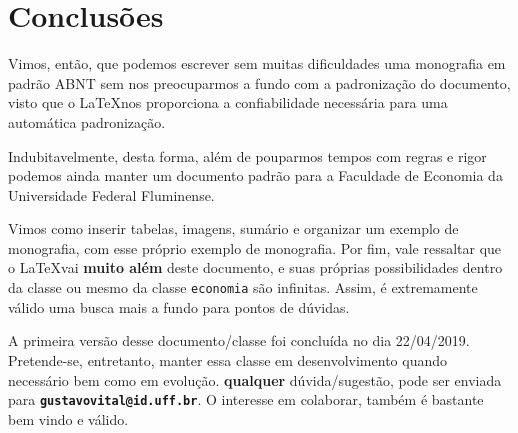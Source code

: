 \chapter{Conclusões}
\label{cap:conclusoes}

Vimos, então, que podemos escrever sem muitas dificuldades uma monografia em padrão ABNT sem nos preocuparmos a fundo com a padronização do documento, visto que o \LaTeX nos proporciona a confiabilidade necessária para uma automática padronização.

Indubitavelmente, desta forma, além de pouparmos tempos com regras e rigor podemos ainda manter um documento padrão para a Faculdade de Economia da Universidade Federal Fluminense.

Vimos como inserir tabelas, imagens, sumário e organizar um exemplo de monografia, com esse próprio exemplo de monografia. Por fim, vale ressaltar que o \LaTeX vai \textbf{muito além} deste documento, e suas próprias possibilidades dentro da classe \abnTeX\space ou mesmo da classe \texttt{economia} são infinitas. Assim, é extremamente válido uma busca mais a fundo para pontos de dúvidas. 

A primeira versão desse documento/classe foi concluída no dia 22/04/2019. Pretende-se, entretanto, manter essa classe em desenvolvimento quando necessário bem como em evolução. \textbf{qualquer} dúvida/sugestão, pode ser enviada para \textbf{\texttt{gustavovital@id.uff.br}}. O interesse em colaborar, também é bastante bem vindo e válido.